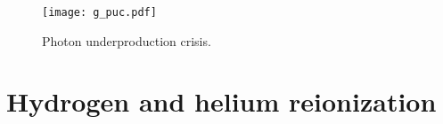 \documentclass[a4paper,fleqn,usenatbib]{mnras}
\begin{document}
\begin{figure}
  \begin{center}
    \texttt{[image: g\_puc.pdf]}
  \end{center}
  \caption{Photon underproduction crisis.\label{fig:puc}}
\end{figure}





\section{Hydrogen and helium reionization}
\end{document}
